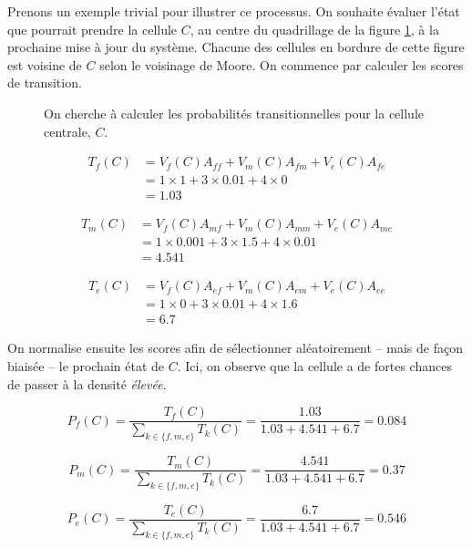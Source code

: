 \documentclass[12pt]{article}
\begin{document}
Prenons un exemple trivial pour illustrer ce processus. On souhaite
évaluer l'état que pourrait prendre la cellule $C$, au centre du
quadrillage de la figure \ref{fig:ca-example}, à la prochaine mise à
jour du système. Chacune des cellules en bordure de cette figure est
voisine de $C$ selon le voisinage de Moore. On commence par calculer
les scores de transition.

\begin{figure}[!ht]
  \centering
  
  \caption{On cherche à calculer les probabilités transitionnelles
    pour la cellule centrale, $C$.}
  \label{fig:ca-example}
\end{figure}

\begin{align*}
T_f(C) &= V_f(C) A_{ff} + V_m(C) A_{fm} + V_e(C) A_{fe} \\
       &= 1 \times 1 + 3 \times 0.01 + 4 \times 0 \\
       &= 1.03
\end{align*}

\begin{align*}
T_m(C) &= V_f(C) A_{mf} + V_m(C) A_{mm} + V_e(C) A_{me} \\
       &= 1 \times 0.001 + 3 \times 1.5 + 4 \times 0.01 \\
       &= 4.541
\end{align*}

\begin{align*}
T_e(C) &= V_f(C) A_{ef} + V_m(C) A_{em} + V_e(C) A_{ee} \\
       &= 1 \times 0 + 3 \times 0.01 + 4 \times 1.6 \\
       &= 6.7
\end{align*}

On normalise ensuite les scores afin de sélectionner aléatoirement --
mais de façon biaisée -- le prochain état de $C$. Ici, on observe que
la cellule a de fortes chances de passer à la densité \textit{élevée}.

\begin{equation*}
P_f(C) = \frac{T_f(C)}{\sum_{k \in \{f,m,e\}} T_k(C)} = \frac{1.03}{1.03 + 4.541 + 6.7} = 0.084
\end{equation*}

\begin{equation*}
P_m(C) = \frac{T_m(C)}{\sum_{k \in \{f,m,e\}} T_k(C)} = \frac{4.541}{1.03 + 4.541 + 6.7} = 0.37
\end{equation*}

\begin{equation*}
P_e(C) = \frac{T_e(C)}{\sum_{k \in \{f,m,e\}} T_k(C)} = \frac{6.7}{1.03 + 4.541 + 6.7} = 0.546
\end{equation*}
\end{document}
